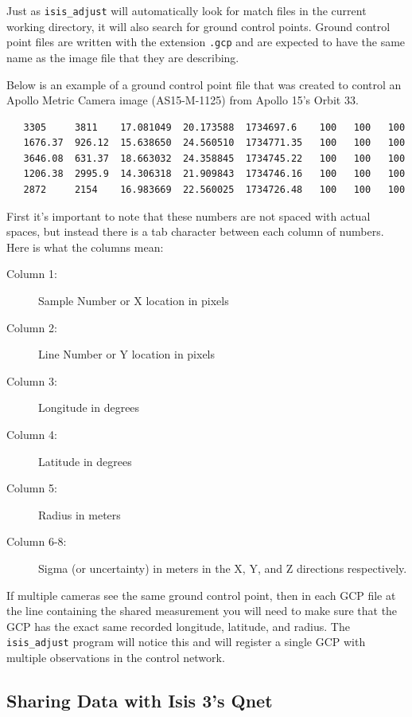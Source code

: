 Just as \texttt{isis\_adjust} will automatically look for match files
in the current working directory, it will also search for ground
control points. Ground control point files are written with the
extension \texttt{.gcp} and are expected to have the same name as the
image file that they are describing.

Below is an example of a ground control point file that was created to
control an Apollo Metric Camera image (AS15-M-1125) from Apollo 15's
Orbit 33.

\begin{verbatim}
   3305     3811    17.081049  20.173588  1734697.6    100   100   100
   1676.37  926.12  15.638650  24.560510  1734771.35   100   100   100
   3646.08  631.37  18.663032  24.358845  1734745.22   100   100   100
   1206.38  2995.9  14.306318  21.909843  1734746.16   100   100   100
   2872     2154    16.983669  22.560025  1734726.48   100   100   100
\end{verbatim}

First it's important to note that these numbers are not spaced with
actual spaces, but instead there is a tab character between each
column of numbers. Here is what the columns mean:

\begin{myindentpar}{2cm}
\begin{description}
  \item[Column 1:] Sample Number or X location in pixels
  \item[Column 2:] Line Number or Y location in pixels
  \item[Column 3:] Longitude in degrees
  \item[Column 4:] Latitude in degrees
  \item[Column 5:] Radius in meters
  \item[Column 6-8:] Sigma (or uncertainty) in meters in the X, Y,
    and Z directions respectively.
\end{description}
\end{myindentpar}

If multiple cameras see the same ground control point, then in each
GCP file at the line containing the shared measurement you will
need to make sure that the GCP has the exact same recorded longitude,
latitude, and radius. The \texttt{isis\_adjust} program will notice
this and will register a single GCP with multiple observations in
the control network.

\subsection{Sharing Data with Isis 3's Qnet}


